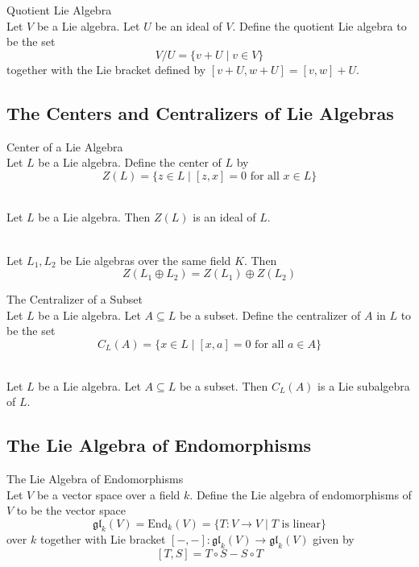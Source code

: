 \documentclass[a4paper]{article}
\begin{document}
\begin{defn}{Quotient Lie Algebra}{} \\Let $V$ be a Lie algebra. Let $U$ be an ideal of $V$. Define the quotient Lie algebra to be the set $$V/U=\{v+U\;|\;v\in V\}$$ together with the Lie bracket defined by $[v+U,w+U]=[v,w]+U$. 
\end{defn}

\subsection{The Centers and Centralizers of Lie Algebras}
\begin{defn}{Center of a Lie Algebra}{} \\Let $L$ be a Lie algebra. Define the center of $L$ by $$Z(L)=\{z\in L\;|\;[z,x]=0\text{ for all }x\in L\}$$
\end{defn}

\begin{lmm}{}{} \\Let $L$ be a Lie algebra. Then $Z(L)$ is an ideal of $L$. 
\end{lmm}

\begin{prp}{}{} \\Let $L_1,L_2$ be Lie algebras over the same field $K$. Then $$Z(L_1\oplus L_2)=Z(L_1)\oplus Z(L_2)$$
\end{prp}

\begin{defn}{The Centralizer of a Subset}{} \\Let $L$ be a Lie algebra. Let $A\subseteq L$ be a subset. Define the centralizer of $A$ in $L$ to be the set $$C_L(A)=\{x\in L\;|\;[x,a]=0\text{ for all }a\in A\}$$
\end{defn}

\begin{lmm}{}{} \\Let $L$ be a Lie algebra. Let $A\subseteq L$ be a subset. Then $C_L(A)$ is a Lie subalgebra of $L$. 
\end{lmm}

\subsection{The Lie Algebra of Endomorphisms}
\begin{defn}{The Lie Algebra of Endomorphisms}{} \\Let $V$ be a vector space over a field $k$. Define the Lie algebra of endomorphisms of $V$ to be the vector space $$\mathfrak{gl}_k(V)=\text{End}_k(V)=\{T:V\to V\;|\;T\text{ is linear}\}$$ over $k$ together with Lie bracket $[-,-]:\mathfrak{gl}_k(V)\to\mathfrak{gl}_k(V)$ given by $$[T,S]=T\circ S-S\circ T$$
\end{defn}
\end{document}
